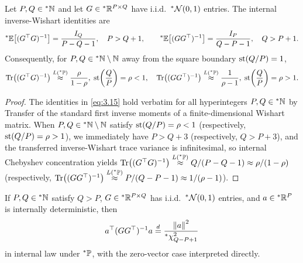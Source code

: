 \begin{lemma}\label{lem:3.2}
Let $P, Q \in {}^*\mathbb{N}$ and let $G \in {}^*\mathbb{R}^{P \times Q}$ have i.i.d.\ ${}^*\mathcal{N}(0, 1)$ entries. The internal inverse-Wishart identities are
\begin{equation}\label{eq:3.15}
{}^*\mathbb{E}\bigl[(G^\top G)^{-1}\bigr] = \frac{I_Q}{P - Q - 1}, \quad P > Q + 1, \qquad {}^*\mathbb{E}\bigl[(G G^\top)^{-1}\bigr] = \frac{I_P}{Q - P - 1}, \quad Q > P + 1.
\end{equation}
Consequently, for $P, Q \in {}^*\mathbb{N} \setminus \mathbb{N}$ away from the square boundary $\operatorname{st}(Q/P) = 1$,
\begin{equation}\label{eq:3.16}
\operatorname{Tr}\bigl((G^\top G)^{-1}\bigr) \stackrel{L({}^*\mathbb{P})}{\approx} \frac{\rho}{1 - \rho}, \; \operatorname{st}\!\left(\frac{Q}{P}\right) = \rho < 1, \quad \operatorname{Tr}\bigl((G G^\top)^{-1}\bigr) \stackrel{L({}^*\mathbb{P})}{\approx} \frac{1}{\rho - 1}, \; \operatorname{st}\!\left(\frac{Q}{P}\right) = \rho > 1.
\end{equation}
\end{lemma}

\begin{proof}
The identities in \eqref{eq:3.15} hold verbatim for all hyperintegers $P, Q \in {}^*\mathbb{N}$ by Transfer of the standard first inverse moments of a finite-dimensional Wishart matrix. When $P, Q \in {}^*\mathbb{N} \setminus \mathbb{N}$ satisfy $\operatorname{st}(Q/P) = \rho < 1$ (respectively, $\operatorname{st}(Q/P) = \rho > 1$), we immediately have $P > Q + 3$ (respectively, $Q > P + 3$), and the transferred inverse-Wishart trace variance is infinitesimal, so internal Chebyshev concentration yields $\operatorname{Tr}\bigl((G^\top G)^{-1}\bigr) \stackrel{L({}^*\mathbb{P})}{\approx} Q/(P - Q - 1) \approx \rho/(1 - \rho)$ (respectively, $\operatorname{Tr}\bigl((G G^\top)^{-1}\bigr) \stackrel{L({}^*\mathbb{P})}{\approx} P/(Q - P - 1) \approx 1/(\rho - 1)$).
\end{proof}

\begin{lemma}\label{lem:3.3}
If $P, Q \in {}^*\mathbb{N}$ satisfy $Q > P$, $G \in {}^*\mathbb{R}^{P \times Q}$ has i.i.d.\ ${}^*\mathcal{N}(0, 1)$ entries, and $a \in {}^*\mathbb{R}^P$ is internally deterministic, then
\begin{equation}\label{eq:3.17}
a^\top (G G^\top)^{-1} a \stackrel{d}{=} \frac{\left\lVert a \right\rVert^2}{{}^*\chi^2_{Q - P + 1}}
\end{equation}
in internal law under ${}^*\mathbb{P}$, with the zero-vector case interpreted directly.
\end{lemma}

